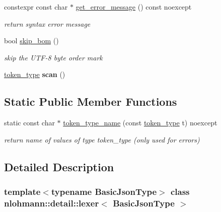 \begin{DoxyCompactItemize}
constexpr const char $\ast$ \hyperlink{classnlohmann_1_1detail_1_1lexer_a53cebbc684ef97fa49651eb442d58f86}{get\+\_\+error\+\_\+message} () const noexcept
\begin{DoxyCompactList}\small\item\em return syntax error message \end{DoxyCompactList}\item 
bool \hyperlink{classnlohmann_1_1detail_1_1lexer_a709afd52def2e258dac0b8a67dc4ea26}{skip\+\_\+bom} ()
\begin{DoxyCompactList}\small\item\em skip the U\+T\+F-\/8 byte order mark \end{DoxyCompactList}\item 
\mbox{\label{classnlohmann_1_1detail_1_1lexer_aac3041cd2b9291e64fee38db422863c9}} 
\hyperlink{classnlohmann_1_1detail_1_1lexer_a3f313cdbe187cababfc5e06f0b69b098}{token\+\_\+type} {\bfseries scan} ()
\end{DoxyCompactItemize}
\subsection*{Static Public Member Functions}
\begin{DoxyCompactItemize}
\item 
\mbox{\label{classnlohmann_1_1detail_1_1lexer_ae514e2005f0ce185f1ad366139e541e8}} 
static const char $\ast$ \hyperlink{classnlohmann_1_1detail_1_1lexer_ae514e2005f0ce185f1ad366139e541e8}{token\+\_\+type\+\_\+name} (const \hyperlink{classnlohmann_1_1detail_1_1lexer_a3f313cdbe187cababfc5e06f0b69b098}{token\+\_\+type} t) noexcept
\begin{DoxyCompactList}\small\item\em return name of values of type token\+\_\+type (only used for errors) \end{DoxyCompactList}\end{DoxyCompactItemize}


\subsection{Detailed Description}
\subsubsection*{template$<$typename Basic\+Json\+Type$>$\newline
class nlohmann\+::detail\+::lexer$<$ Basic\+Json\+Type $>$}

